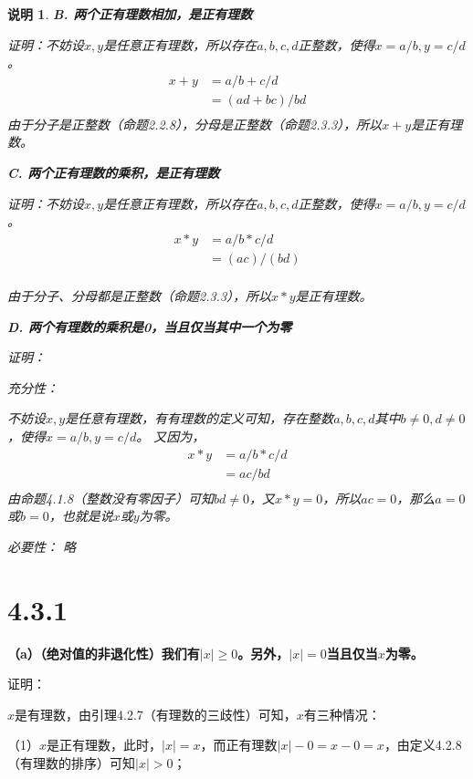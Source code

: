 \documentclass{article}
\theoremstyle{mystyle}
\newtheorem*{zremark}{说明}
\begin{document}
\begin{zgraytheorem}
\begin{zremark}
    \textbf{B. 两个正有理数相加，是正有理数}

    证明：不妨设$x,y$是任意正有理数，所以存在$a,b,c,d$正整数，使得$x=a/b,y=c/d$。
    \begin{align*}
      x + y & = a/b + c/d      \\
            & = (ad + bc) / bd \\
    \end{align*}
    由于分子是正整数（命题2.2.8），分母是正整数（命题2.3.3），所以$x+y$是正有理数。

    \textbf{C. 两个正有理数的乘积，是正有理数}

    证明：不妨设$x,y$是任意正有理数，所以存在$a,b,c,d$正整数，使得$x=a/b,y=c/d$。
    \begin{align*}
      x * y & = a/b * c/d \\
            & = (ac)/(bd) \\
    \end{align*}

    由于分子、分母都是正整数（命题2.3.3），所以$x*y$是正有理数。

    \textbf{D. 两个有理数的乘积是0，当且仅当其中一个为零}

    证明：

    充分性：

    不妨设$x,y$是任意有理数，有有理数的定义可知，存在整数$a,b,c,d$其中$b \neq 0, d \neq 0$，使得$x=a/b,y=c/d$。
    又因为，
    \begin{align*}
      x * y & = a/b * c/d \\
            & =  ac / bd  \\
    \end{align*}
    由命题4.1.8（整数没有零因子）可知$bd \neq 0$，又$x * y = 0$，所以$ac = 0$，那么$a=0$或$b=0$，也就是说$x$或$y$为零。

    必要性： 略

  \end{zremark}
\end{zgraytheorem}

\section*{4.3.1}

\textbf{（a）（绝对值的非退化性）我们有$|x| \geq 0$。另外，$|x|=0$当且仅当$x$为零。}

证明：

$x$是有理数，由引理4.2.7（有理数的三歧性）可知，$x$有三种情况：

（1）$x$是正有理数，此时，$|x|=x$，而正有理数$|x|-0=x-0=x$，由定义4.2.8（有理数的排序）可知$|x|>0$；
\end{document}
